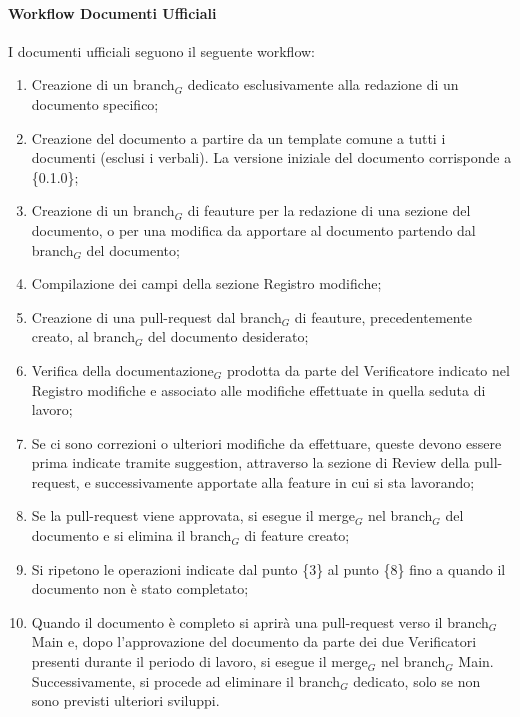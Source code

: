 \documentclass[10pt]{article}
\begin{document}
\begin{justify}
        \paragraph{Workflow Documenti Ufficiali}
        I documenti ufficiali seguono il seguente workflow:
        \begin{enumerate}
            \item Creazione di un branch$_G$ dedicato esclusivamente alla redazione di un documento specifico;
            \item Creazione del documento a partire da un template comune a tutti i documenti (esclusi i verbali). La versione iniziale del documento corrisponde a \{0.1.0\};
            \item Creazione di un branch$_G$ di feauture per la redazione di una sezione del documento, o per una modifica da apportare al documento partendo dal branch$_G$ del documento;
            \item Compilazione dei campi della sezione Registro modifiche;
            \item Creazione di una pull-request dal branch$_G$ di feauture, precedentemente creato, al branch$_G$ del documento desiderato;
            \item Verifica della documentazione$_G$ prodotta da parte del Verificatore indicato nel Registro modifiche e associato alle modifiche effettuate in quella seduta di lavoro;
            \item Se ci sono correzioni o ulteriori modifiche da effettuare, queste devono essere prima indicate tramite suggestion, attraverso la sezione di Review della pull-request, e successivamente apportate alla feature in cui si sta lavorando;
            \item Se la pull-request viene approvata, si esegue il merge$_G$ nel branch$_G$ del documento e si elimina il branch$_G$ di feature creato;
            \item Si ripetono le operazioni indicate dal punto \{3\} al punto \{8\} fino a quando il documento non è stato completato;
            \item Quando il documento è completo si aprirà una pull-request verso il branch$_G$ Main e, dopo l'approvazione del documento da parte dei due Verificatori presenti durante il periodo di lavoro, si esegue il merge$_G$ nel branch$_G$ Main. Successivamente, si procede ad eliminare il branch$_G$ dedicato, solo se non sono previsti ulteriori sviluppi.
        \end{enumerate}


\end{justify}
\end{document}
